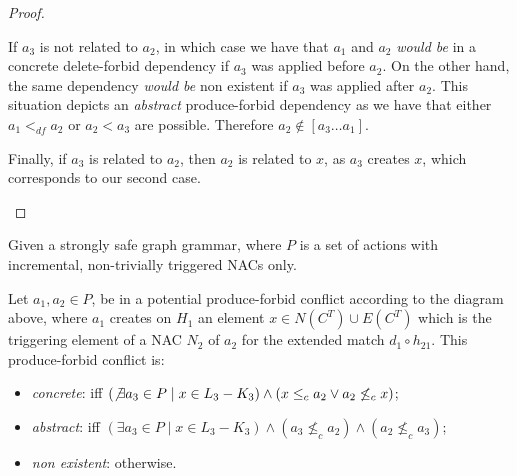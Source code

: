 \begin{proof}
\begin{description}[style=nextline,leftmargin=*]
    If $a_3$ is not related to $a_2$, in which case we have that $a_1$ and $a_2$ \emph{would be} in a concrete delete-forbid dependency if $a_3$ was applied before $a_2$. On the other hand, the same dependency \emph{would be} non existent if $a_3$ was applied after $a_2$. This situation depicts an \emph{abstract} produce-forbid dependency as we have that either $a_1 <_{df} a_2$ or $a_2 < a_3$ are possible. Therefore $a_2 \not\in [a_3 \ldots a_1]$.

  Finally, if $a_3$ is related to $a_2$, then $a_2$ is related to $x$, as $a_3$ creates $x$, which corresponds to our second case.
\end{description}
\end{proof}

\begin{definition}\label{def:produce-forbid-strong} Given \doublyTypedGraphGrammarCore{} a strongly safe graph grammar, where $P$ is a set of actions with incremental, non-trivially triggered NACs only.

\hfill

  Let $a_1,a_2 \in P$, be in a potential produce-forbid conflict according to the diagram above, where $a_1$ creates on $H_1$ an element $x \in N(C^T) \cup E(C^T)$ which is the triggering element of a NAC $N_2$ of $a_2$ for the extended match $d_1 \circ h_{21}$. This produce-forbid conflict is:

\begin{itemize}
  \item \emph{concrete}: iff $(\not\exists a_3 \in P \mid x \in L_3 - K_3) \land (x \leq_c a_2 \lor a_2 \not\leq_c x)$; %
  \item \emph{abstract}: iff $(\exists a_3 \in P \mid x \in L_3 - K_3) \land (a_3 \not\leq_c a_2) \land (a_2 \not\leq_c a_3)$;
  \item \emph{non existent}: otherwise.
\end{itemize}

\end{definition}

